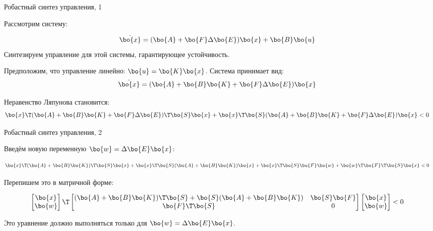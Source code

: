 \documentclass{beamer}
\begin{document}
\begin{frame}{Робастный синтез управления, 1}
	\begin{flushleft}
		
		Рассмотрим систему: 
		
		\begin{equation}
			\dot{\bo{x}}  = (\bo{A} + \bo{F} \Delta \bo{E})\bo{x} + \bo{B}\bo{u}
		\end{equation}
		Синтезируем управление для этой системы, гарантирующее устойчивость.
		
		\bigskip
		
		Предположим, что управление линейно: $\bo{u} = \bo{K}\bo{x}$. Система принимает вид:
		\begin{equation}
			\dot{\bo{x}}  = (\bo{A} + \bo{B}\bo{K} + \bo{F} \Delta \bo{E})\bo{x}
		\end{equation}
		
		Неравенство Ляпунова становится:
		\begin{equation}
			\bo{x}\T(\bo{A} + \bo{B}\bo{K} + \bo{F} \Delta \bo{E})\T\bo{S}\bo{x}
			+
			\bo{x}\T \bo{S} (\bo{A} + \bo{B}\bo{K} + \bo{F} \Delta \bo{E})\bo{x} < 0
		\end{equation}
		
		
		
	\end{flushleft}
\end{frame}

\begin{frame}{Робастный синтез управления, 2}
	\begin{flushleft}
		
		Введём новую переменную $\bo{w} = \Delta \bo{E} \bo{x}$:
		
		\begin{equation*}
			\bo{x}\T(\bo{A} + \bo{B}\bo{K})\T\bo{S}\bo{x}
			+
			\bo{x}\T \bo{S} (\bo{A} + \bo{B}\bo{K})\bo{x}
			+
			\bo{x}\T\bo{S}\bo{F}\bo{w} + \bo{w}\T\bo{F}\T\bo{S}\bo{x} < 0
		\end{equation*}
		
		Перепишем это в матричной форме:
		
		\begin{equation}
			\label{eq:quad_xw_1}
			\begin{bmatrix}
				\bo{x} \\ \bo{w}
			\end{bmatrix}\T
			\begin{bmatrix}
				(\bo{A} + \bo{B}\bo{K})\T\bo{S} + \bo{S} (\bo{A} + \bo{B}\bo{K}) & \bo{S}\bo{F} \\
				\bo{F}\T\bo{S} & 0
			\end{bmatrix}
			\begin{bmatrix}
				\bo{x} \\ \bo{w}
			\end{bmatrix} < 0
		\end{equation}		
		
		Это уравнение должно выполняться только для $\bo{w} = \Delta \bo{E} \bo{x}$.
		
		
		
	\end{flushleft}
\end{frame}
\end{document}
